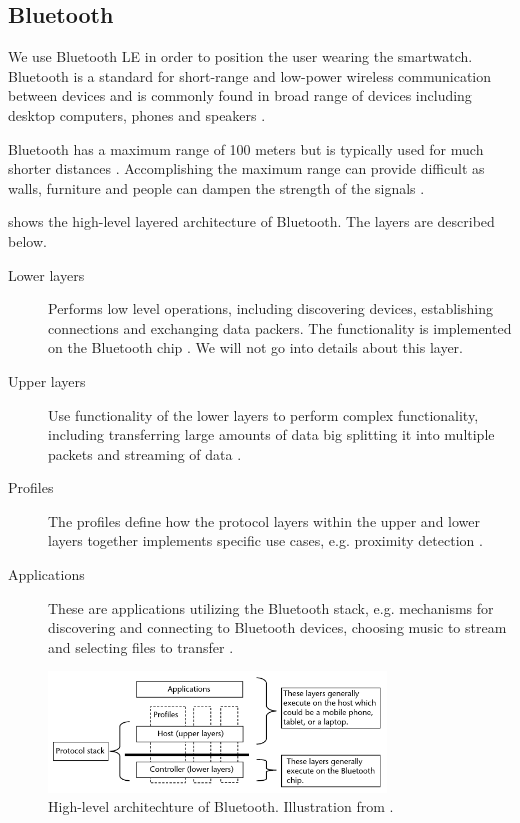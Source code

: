\subsection{Bluetooth}
\label{sec:analysis:bluetooth}

We use Bluetooth LE in order to position the user wearing the smartwatch. Bluetooth is a standard for short-range and low-power wireless communication between devices and is commonly found in broad range of devices including desktop computers, phones and speakers \cite{gupta2013inside}.

Bluetooth has a maximum range of 100 meters but is typically used for much shorter distances \cite[p. 20]{gupta2013inside}. Accomplishing the maximum range can provide difficult as walls, furniture and people can dampen the strength of the signals \cite{faragher2014analysis}.

 shows the high-level layered architecture of Bluetooth. The layers are described below.

\begin{description}
\item[Lower layers] Performs low level operations, including discovering devices, establishing connections and exchanging data packers. The functionality is implemented on the Bluetooth chip \cite[pp. 21-22]{gupta2013inside}. We will not go into details about this layer.
\item[Upper layers] Use functionality of the lower layers to perform complex functionality, including transferring large amounts of data big splitting it into multiple packets and streaming of data \cite[p. 22]{gupta2013inside}.
\item[Profiles] The profiles define how the protocol layers within the upper and lower layers together implements specific use cases, e.g. proximity detection \cite[p. 22]{gupta2013inside}.
\item[Applications] These are applications utilizing the Bluetooth stack, e.g. mechanisms for discovering and connecting to Bluetooth devices, choosing music to stream and selecting files to transfer \cite[p. 22]{gupta2013inside}.
\end{description}

\begin{figure}[!htb]
\centering
\includegraphics[width=0.8\textwidth]{images/bluetooth-architecture}
\caption{High-level architechture of Bluetooth. Illustration from \cite[p. 22]{gupta2013inside}.}
\label{fig:analysis:bluetooth:highlevel-architecture}
\end{figure}

